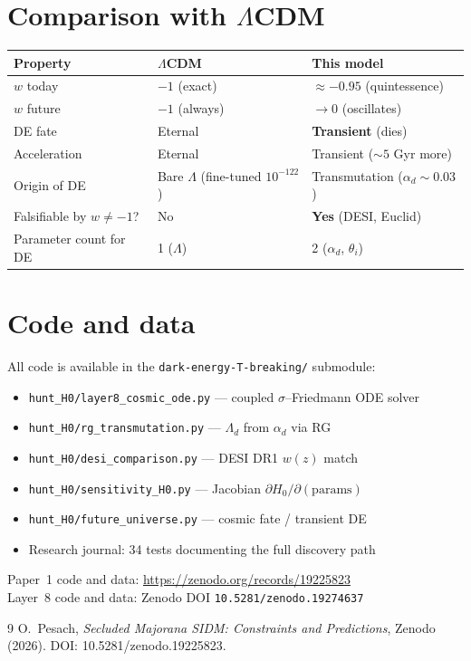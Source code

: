 \documentclass[11pt,a4paper]{article}
\newcommand{\Ld}{\Lambda_d}
\begin{document}
\section{Comparison with $\Lambda$CDM}

\begin{center}
\begin{tabular}{@{}lll@{}}
\toprule
Property & $\Lambda$CDM & This model \\
\midrule
$w$ today & $-1$ (exact) & $\approx-0.95$ (quintessence) \\
$w$ future & $-1$ (always) & $\to 0$ (oscillates) \\
DE fate & Eternal & \textbf{Transient} (dies) \\
Acceleration & Eternal & Transient ($\sim5$ Gyr more) \\
Origin of DE & Bare $\Lambda$ (fine-tuned $10^{-122}$) & Transmutation ($\alpha_d\sim0.03$) \\
Falsifiable by $w\neq-1$? & No & \textbf{Yes} (DESI, Euclid) \\
Parameter count for DE & 1 ($\Lambda$) & 2 ($\alpha_d$, $\theta_i$) \\
\bottomrule
\end{tabular}
\end{center}

\section{Code and data}

All code is available in the \texttt{dark-energy-T-breaking/} submodule:
\begin{itemize}[nosep]
  \item \texttt{hunt\_H0/layer8\_cosmic\_ode.py} --- coupled $\sigma$--Friedmann ODE solver
  \item \texttt{hunt\_H0/rg\_transmutation.py} --- $\Ld$ from $\alpha_d$ via RG
  \item \texttt{hunt\_H0/desi\_comparison.py} --- DESI DR1 $w(z)$ match
  \item \texttt{hunt\_H0/sensitivity\_H0.py} --- Jacobian $\partial H_0/\partial(\mathrm{params})$
  \item \texttt{hunt\_H0/future\_universe.py} --- cosmic fate / transient DE
  \item Research journal: 34 tests documenting the full discovery path
\end{itemize}

\noindent
Paper~1 code and data: \url{https://zenodo.org/records/19225823}\\
Layer~8 code and data: Zenodo DOI \texttt{10.5281/zenodo.19274637}

\begin{thebibliography}{9}
 O.~Pesach, \emph{Secluded Majorana SIDM: Constraints and Predictions}, Zenodo (2026). DOI: 10.5281/zenodo.19225823.
\end{thebibliography}
\end{document}
